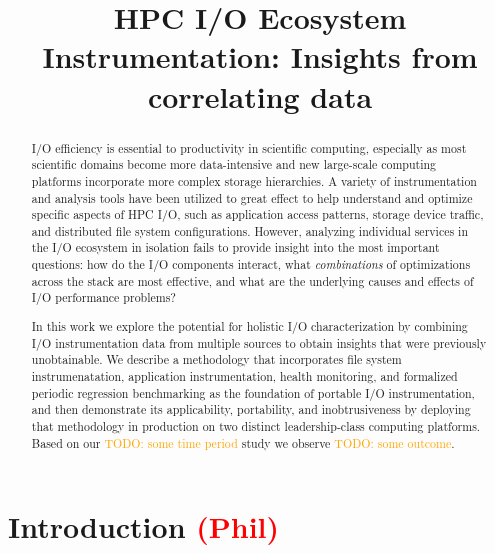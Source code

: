 \documentclass[conference,10pt,compsocconf]{IEEEtran}
\newcommand{\assign}[1]{\textcolor{red}{(#1)}}
\newcommand{\todo}[1]{\textcolor{Orange}{TODO: #1}}
\begin{document}
\title{HPC I/O Ecosystem Instrumentation: Insights from correlating data}

\maketitle

\begin{abstract}

I/O efficiency is essential to productivity in scientific computing,
especially as most scientific domains become more data-intensive and
new large-scale computing platforms incorporate more complex storage
hierarchies.  A variety of instrumentation and analysis tools have been
utilized to great effect to help understand and optimize specific aspects of
HPC I/O, such as application access patterns, storage device traffic, and
distributed file system configurations.  However, analyzing individual services in the
I/O ecosystem in isolation fails to provide insight into the most important
questions: how do the I/O components interact, what \emph{combinations}
of optimizations across the stack are most effective, and what are the
underlying causes and effects of I/O performance problems?

In this work we explore the potential for holistic I/O characterization
by combining I/O instrumentation data from multiple sources to obtain
insights that were previously unobtainable. We describe a methodology that
incorporates file system instrumenatation, application instrumentation,
health monitoring, and formalized periodic regression benchmarking as
the foundation of portable I/O instrumentation, and then demonstrate
its applicability, portability, and inobtrusiveness by deploying that
methodology in production on two distinct leadership-class computing
platforms. Based on our \todo{some time period} study we observe
\todo{some outcome}.

\end{abstract}

\section{Introduction \assign{Phil}}


\end{document}
